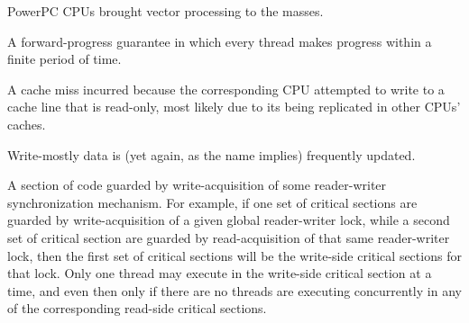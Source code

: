 \begin{description}
	PowerPC CPUs brought vector processing to the masses.
\item[\IXG{Wait Free}:]
	A forward-progress guarantee in which every thread makes
	progress within a finite period of time.
\item[\IXGalth{Write Miss}{write}{cache miss}:]
	A cache miss incurred because the corresponding CPU attempted
	to write to a cache line that is read-only, most likely due
	to its being replicated in other CPUs' caches.
\item[\IXG{Write Mostly}:]
	Write-mostly data is (yet again, as the name implies) frequently
	updated.
\item[\IXGh{Write-Side}{Critical Section}:]
	A section of code guarded by write-acquisition of
	some reader-writer synchronization mechanism.
	For example, if one set of critical sections are guarded by
	write-acquisition of
	a given global reader-writer lock, while a second set of critical
	section are guarded by read-acquisition of that same reader-writer
	lock, then the first set of critical sections will be the
	write-side critical sections for that lock.
	Only one thread may execute in the write-side critical section
	at a time, and even then only if there are no threads are
	executing concurrently in any of the corresponding read-side
	critical sections.
\end{description}
